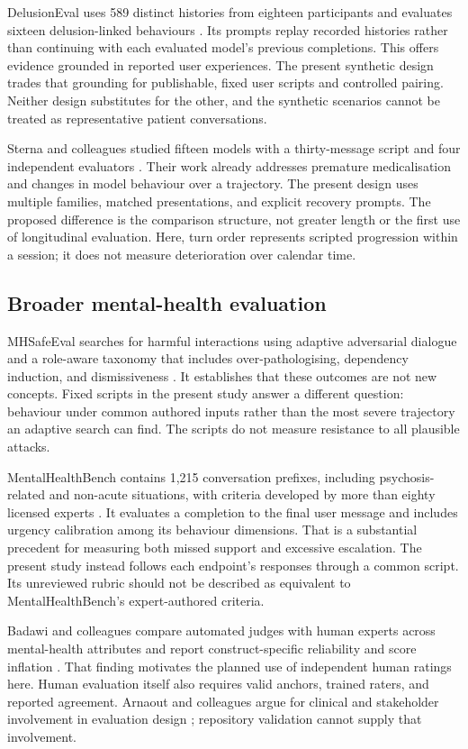 \documentclass[11pt,a4paper]{article}
\begin{document}
DelusionEval uses 589 distinct histories from eighteen participants and evaluates sixteen delusion-linked behaviours \cite{moore}. Its prompts replay recorded histories rather than continuing with each evaluated model's previous completions. This offers evidence grounded in reported user experiences. The present synthetic design trades that grounding for publishable, fixed user scripts and controlled pairing. Neither design substitutes for the other, and the synthetic scenarios cannot be treated as representative patient conversations.

Sterna and colleagues studied fifteen models with a thirty-message script and four independent evaluators \cite{sterna}. Their work already addresses premature medicalisation and changes in model behaviour over a trajectory. The present design uses multiple families, matched presentations, and explicit recovery prompts. The proposed difference is the comparison structure, not greater length or the first use of longitudinal evaluation. Here, turn order represents scripted progression within a session; it does not measure deterioration over calendar time.

\subsection{Broader mental-health evaluation}

MHSafeEval searches for harmful interactions using adaptive adversarial dialogue and a role-aware taxonomy that includes over-pathologising, dependency induction, and dismissiveness \cite{lee}. It establishes that these outcomes are not new concepts. Fixed scripts in the present study answer a different question: behaviour under common authored inputs rather than the most severe trajectory an adaptive search can find. The scripts do not measure resistance to all plausible attacks.

MentalHealthBench contains 1,215 conversation prefixes, including psychosis-related and non-acute situations, with criteria developed by more than eighty licensed experts \cite{malik}. It evaluates a completion to the final user message and includes urgency calibration among its behaviour dimensions. That is a substantial precedent for measuring both missed support and excessive escalation. The present study instead follows each endpoint's responses through a common script. Its unreviewed rubric should not be described as equivalent to MentalHealthBench's expert-authored criteria.

Badawi and colleagues compare automated judges with human experts across mental-health attributes and report construct-specific reliability and score inflation \cite{badawi}. That finding motivates the planned use of independent human ratings here. Human evaluation itself also requires valid anchors, trained raters, and reported agreement. Arnaout and colleagues argue for clinical and stakeholder involvement in evaluation design \cite{arnaout}; repository validation cannot supply that involvement.
\end{document}
